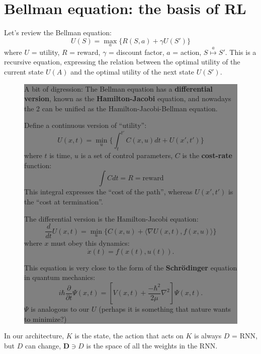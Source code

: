 \documentclass[12pt]{article}
\begin{document}
\section{Bellman equation: the basis of RL}

Let's review the Bellman equation:
$$ U(S) = \max_a \{ R(S,a) + \gamma U(S') \}$$
where $U$ = utility, $R$ = reward, $\gamma$ = discount factor, $a$ = action, $S \stackrel{a}{\mapsto} S'$.  This is a recursive equation, expressing the relation between the optimal utility of the current state $U(A)$ and the optimal utility of the next state $U(S')$.

\begin{figure}[!h!t!b!p]
\begin{center}
\colorbox{grey}{\parbox{0.95\textwidth}{\setlength{\parskip}{2.5ex}
A bit of digression:  The Bellman equation has a \textbf{differential version}, known as the \textbf{Hamilton-Jacobi} equation, and nowadays the 2 can be unified as the Hamilton-Jacobi-Bellman equation.

Define a continuous version of ``utility'':
$$ U(x,t) = \min_u \{ \int_t^{t'} C(x,u)dt + U(x',t') \} $$
where $t$ is time, $u$ is a set of control parameters, $C$ is the \textbf{cost-rate} function:
$$ \int C dt = R = \mbox{reward} $$
This integral expresses the ``cost of the path'', whereas $U(x',t')$ is the ``cost at termination''.

The differential version is the Hamilton-Jacobi equation:
$$ \frac{d}{dt} U(x,t) = \min_u \{ C(x,u) + \langle \nabla U(x,t), f(x,u) \rangle \} $$
where $x$ must obey this dynamics:
$$ \dot{x}(t) = f(x(t),u(t)). $$

This equation is very close to the form of the \textbf{Schr\"{o}dinger} equation in quantum mechanics:
$$ i \hbar \frac{\partial}{\partial t} \Psi(x,t) = \left[ V(x,t) + \frac{-\hbar^2}{2\mu} \nabla^2 \right] \Psi(x,t). $$
$\Psi$ is analogous to our $U$ (perhaps it is something that nature wants to minimize?)
}}
\end{center}
\end{figure}


In our architecture, $K$ is the state, the action that acts on $K$ is always $D$ = RNN, but $D$ can change, $\mathbf{D} \ni D$ is the space of all the weights in the RNN.
\end{document}
